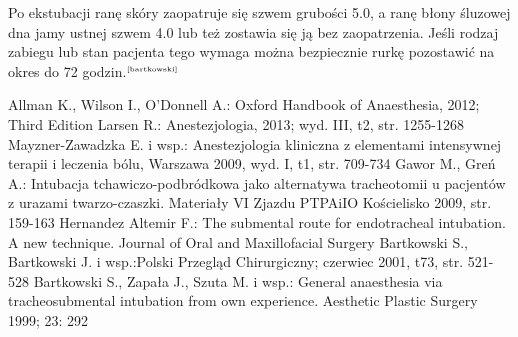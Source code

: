 \documentclass[a4paper, 12pt]{report}
\newcommand\cyt[1]{$^{\tiny{\cite{#1}}}$}
\begin{document}
Po ekstubacji ranę skóry zaopatruje się szwem grubości 5.0, a ranę
błony śluzowej dna jamy ustnej szwem 4.0 lub też zostawia się ją bez
zaopatrzenia. Jeśli rodzaj zabiegu lub stan pacjenta tego wymaga można
bezpiecznie rurkę pozostawić na okres do 72 godzin.\cyt{bartkowski}

\begin{thebibliography}{99}
 Allman K., Wilson I., O'Donnell A.: Oxford Handbook
  of Anaesthesia, 2012; Third Edition
 Larsen R.: Anestezjologia, 2013; wyd. III, t2,
  str. 1255-1268
 Mayzner-Zawadzka E. i wsp.: Anestezjologia
  kliniczna z elementami intensywnej terapii i leczenia bólu, Warszawa
  2009, wyd. I, t1, str. 709-734
Gawor M., Greń A.: Intubacja tchawiczo-podbródkowa jako
  alternatywa tracheotomii u pacjentów z urazami
  twarzo-czaszki. Materiały VI Zjazdu PTPAiIO Kościelisko 2009,
  str. 159-163
 Hernandez Altemir F.: The submental route for
  endotracheal intubation. A new technique. Journal of Oral and
  Maxillofacial Surgery
 Bartkowski S., Bartkowski J. i wsp.:Polski
  Przegląd Chirurgiczny; czerwiec 2001, t73, str. 521-528
 Bartkowski S., Zapała J., Szuta M. i wsp.:
  General anaesthesia via tracheosubmental intubation from own
  experience. Aesthetic Plastic Surgery 1999; 23: 292
\end{thebibliography}
\end{document}
